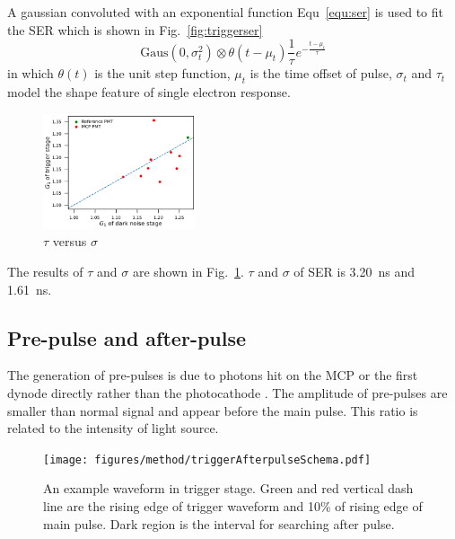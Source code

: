 A gaussian convoluted with an exponential function Equ~\eqref{equ:ser} is used to fit the SER which is shown in Fig.~\ref{fig:triggerser}
\begin{equation}
    \label{equ:ser}
    \mathrm{Gaus}(0,\sigma_t^2)\otimes\theta(t-\mu_t)\frac{1}{\tau}e^{-\frac{t-\mu_t}{\tau}}
\end{equation}
in which $\theta(t)$ is the unit step function, $\mu_t$ is the time offset of pulse, $\sigma_t$ and $\tau_t$ model the shape feature of single electron response. 
\begin{figure}[!htbp]
    \centering
    \includegraphics[width=0.4\textwidth,page=12]{figures/result/compare.pdf}
    \caption{$\tau$ versus $\sigma$}
    \label{fig:sigmaCompare}
\end{figure}

The results of $\tau$ and $\sigma$ are shown in Fig.~\ref{fig:sigmaCompare}. $\tau$ and $\sigma$ of SER is \SI{3.20}{ns} and \SI{1.61}{ns}.

\subsection{Pre-pulse and after-pulse}
The generation of pre-pulses is due to photons hit on the MCP or the first dynode directly rather than the photocathode \cite{JUNOMassTesting}. The amplitude of pre-pulses are smaller than normal signal and appear before the main pulse. This ratio is related to the intensity of light source.
\begin{figure}
    \centering
    \texttt{[image: figures/method/triggerAfterpulseSchema.pdf]}
    \caption{An example waveform in trigger stage. Green and red vertical dash line are the rising edge of trigger waveform and 10\% of rising edge of main pulse. Dark region is the interval for searching after pulse.}
    \label{fig:afterpulseSchema}
\end{figure}

